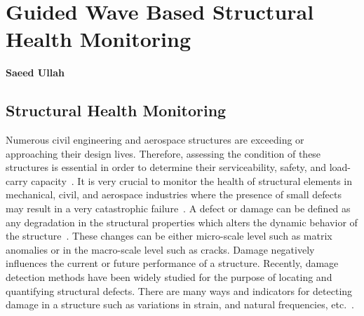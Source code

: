 \documentclass[b5paper, 11pt, titlepage]{book}
\begin{document}
\chapter[Guided Wave Based SHM]{Guided Wave Based Structural Health Monitoring}
\textbf{Saeed Ullah}

\tableofcontents
\newpage
\section{Structural Health Monitoring}
Numerous civil engineering and aerospace structures are exceeding or approaching their design lives. Therefore, assessing the condition of these structures is essential in order to determine their serviceability, safety, and load-carry capacity~\cite{Farrar2007, Alampalli2007, stepinski2013advanced}. It is very crucial to monitor the health of structural elements in mechanical, civil, and aerospace industries where the presence of small defects may result in a very catastrophic failure~\cite{stepinski2013advanced}. A defect or damage can be defined as any degradation in the structural properties which alters the dynamic behavior of the structure~\cite{farrar2003damage, Farrar2012}. These changes can be either micro-scale level such as matrix anomalies or in the macro-scale level such as cracks. Damage negatively influences the current or future performance of a structure. Recently, damage detection methods have been widely studied for the purpose of locating and quantifying structural defects. There are many ways and indicators for detecting damage in a structure such as variations in strain, and natural frequencies, etc.~\cite{rytter1993a}.
\end{document}

